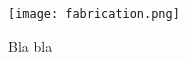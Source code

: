 \begin{figure}[H]
\centering
\texttt{[image: fabrication.png]}
\caption{Bla bla}
\label{fig:fabrication}
\end{figure}